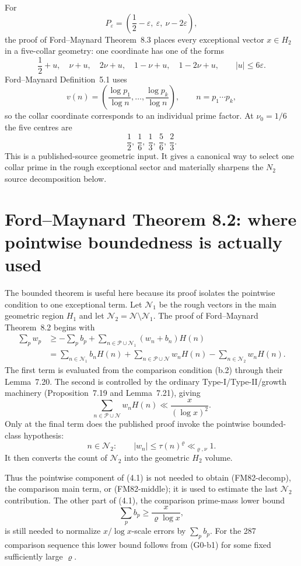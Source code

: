 \documentclass[11pt]{article}
\theoremstyle{definition}
\theoremstyle{remark}
\newcommand{\1}{\mathbf 1}
\begin{document}
For
\[
 P_\varepsilon=\left(\frac12-\varepsilon,\ \varepsilon,\ \nu-2\varepsilon\right),
\]
the proof of Ford--Maynard Theorem~8.3 places every exceptional vector $x\in H_2$ in a five-collar geometry:
one coordinate has one of the forms
\[
 \boxed{
 \frac12+u,\quad \nu+u,\quad 2\nu+u,\quad 1-\nu+u,\quad 1-2\nu+u,
 \qquad |u|\le6\varepsilon.}
\tag{FM-five-collars}
\]
Ford--Maynard Definition~5.1 uses
\[
 \boxed{v(n)=\left(\frac{\log p_1}{\log n},\ldots,
                     \frac{\log p_k}{\log n}\right),\qquad n=p_1\cdots p_k,}
\tag{FM-vn}
\]
so the collar coordinate corresponds to an individual prime factor.  At $\nu_0=1/6$ the five centres are
\[
 \boxed{\frac12,\ \frac16,\ \frac13,\ \frac56,\ \frac23.}
\tag{FM-collar-centres}
\]
This is a published-source geometric input.  It gives a canonical way to select one collar prime in the rough
exceptional sector and materially sharpens the $N_2$ source decomposition below.

\section{Ford--Maynard Theorem 8.2: where pointwise boundedness is actually used}
\label{sec:FM82-localization}

The bounded theorem is useful here because its proof isolates the pointwise condition to one exceptional term.
Let $\mathcal N_1$ be the rough vectors in the main geometric region $H_1$ and let
$\mathcal N_2=\mathcal N\setminus\mathcal N_1$.  The proof of Ford--Maynard Theorem~8.2 begins with
\[
\begin{aligned}
 \sum_p w_p
 &\ge -\sum_p b_p+\sum_{n\in\mathcal P\cup\mathcal N_1}(w_n+b_n)H(n)\\
 &=\sum_{n\in\mathcal N_1}b_nH(n)
   +\sum_{n\in\mathcal P\cup\mathcal N}w_nH(n)
   -\sum_{n\in\mathcal N_2}w_nH(n).
\end{aligned}
\tag{FM82-decomp}
\]
The first term is evaluated from the comparison condition (b.2) through their Lemma~7.20.  The second is
controlled by the ordinary Type-I/Type-II/growth machinery (Proposition~7.19 and Lemma~7.21), giving
\[
 \sum_{n\in\mathcal P\cup\mathcal N}w_nH(n)\ll \frac{x}{(\log x)^2}.
\tag{FM82-middle}
\]
Only at the final term does the published proof invoke the pointwise bounded-class hypothesis:
\[
 n\in\mathcal N_2:\qquad |w_n|\le\tau(n)^\varrho\ll_{\varrho,\nu}1.
\tag{FM82-pointwise}
\]
It then converts the count of $\mathcal N_2$ into the geometric $H_2$ volume.

Thus the pointwise component of (4.1) is not needed to obtain (FM82-decomp), the comparison main term, or
(FM82-middle); it is used to estimate the last $\mathcal N_2$ contribution.  The other part of (4.1), the
comparison prime-mass lower bound
\[
 \sum_p b_p\ge \frac{x}{\varrho\log x},
\tag{FM82-mass}
\]
is still needed to normalize $x/\log x$-scale errors by $\sum_pb_p$.  For the 287 comparison sequence this
lower bound follows from (G0-b1) for some fixed sufficiently large $\varrho$.
\end{document}

